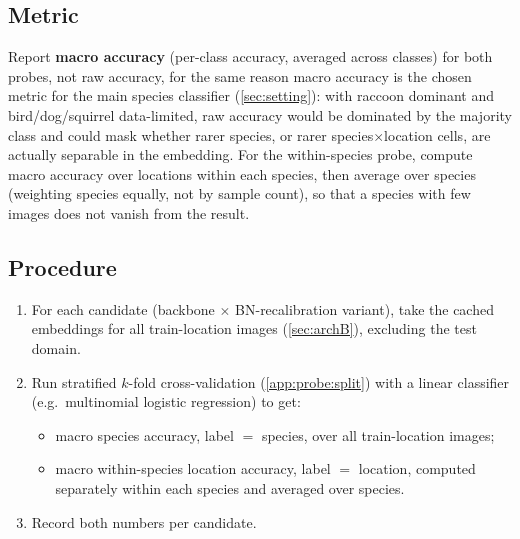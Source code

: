 \subsection{Metric}
\vspace{\dimexpr-\parskip+3pt\relax}
Report \textbf{macro accuracy} (per-class accuracy, averaged across classes) for both probes, not raw
accuracy, for the same reason macro accuracy is the chosen metric for the main species classifier
(\cref{sec:setting}): with raccoon dominant and bird/dog/squirrel data-limited, raw accuracy would be
dominated by the majority class and could mask whether rarer species, or rarer
species$\times$location cells, are actually separable in the embedding. For the within-species probe,
compute macro accuracy over locations within each species, then average over species (weighting
species equally, not by sample count), so that a species with few images does not vanish from the
result.
\vspace{\dimexpr-\parskip+3pt\relax}
\subsection{Procedure}
\vspace{\dimexpr-\parskip+3pt\relax}
\begin{enumerate}[label=(\arabic*),leftmargin=2em,itemsep=0pt,topsep=0pt,parsep=0.4em,partopsep=0pt]
\item For each candidate (backbone $\times$ BN-recalibration variant), take the cached embeddings for
      all train-location images (\cref{sec:archB}), excluding the test domain.
\item Run stratified $k$-fold cross-validation (\cref{app:probe:split}) with a linear classifier
      (e.g.\ multinomial logistic regression) to get:
      \begin{itemize}[leftmargin=1.3em]
      \item macro species accuracy, label $=$ species, over all train-location images;
      \item macro within-species location accuracy, label $=$ location, computed separately within
            each species and averaged over species.
      \end{itemize}
\item Record both numbers per candidate.
\end{enumerate}
\vspace{\dimexpr-\parskip+3pt\relax}
